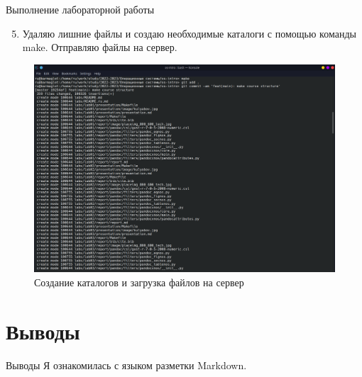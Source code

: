 \documentclass[
  ignorenonframetext,
  aspectratio=169,
]{beamer}
\providecommand{\tightlist}{%
  \setlength{\itemsep}{0pt}\setlength{\parskip}{0pt}}
\begin{document}
\begin{frame}{Выполнение лабораторной работы}
\begin{enumerate}
\setcounter{enumi}{4}
\tightlist
\item
  Удаляю лишние файлы и создаю необходимые каталоги с помощью команды
  make. Отправляю файлы на сервер.
\end{enumerate}

\begin{figure}
\hypertarget{fig:003}{%
\centering
\includegraphics[width=1\textwidth,height=\textheight]{image/3.png}
\caption{Создание каталогов и загрузка файлов на сервер}\label{fig:003}
}
\end{figure}
\end{frame}

\hypertarget{ux432ux44bux432ux43eux434ux44b}{%
\section{Выводы}\label{ux432ux44bux432ux43eux434ux44b}}

\begin{frame}{Выводы}
Я ознакомилась с языком разметки Markdown.
\end{frame}
\end{document}
